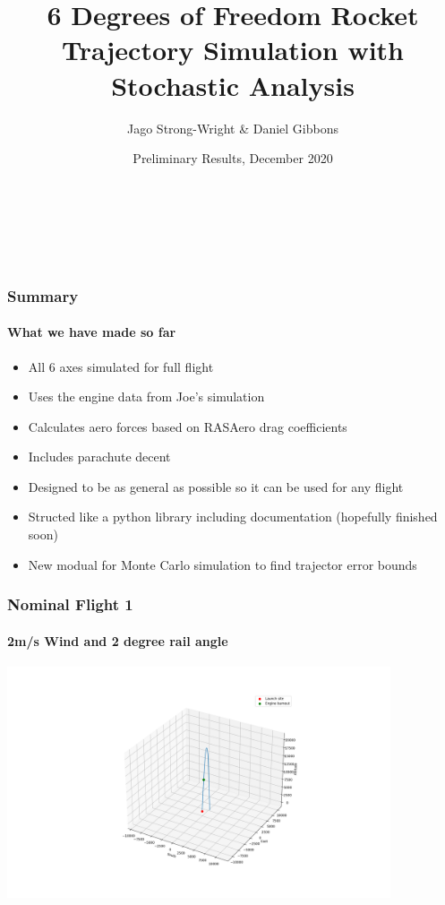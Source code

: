 \documentclass{beamer}
\title[6DOF Trajectory Simulation: Preliminary Results]{6 Degrees of Freedom Rocket Trajectory Simulation with Stochastic Analysis} %
\author%
{Jago Strong-Wright \& Daniel Gibbons
}
\institute%
{%
    \textit{}\\
    \textit{}
}
\date[Dec 2020]{Preliminary Results, December 2020} %
\begin{document}
    \begin{frame}
        \begin{titlepage}
                {\inserttitle\\[0.9cm]}
                {\insertauthor\par}
                {\insertinstitute\\[0.3cm]}
                {\insertdate}
        \end{titlepage}
    \end{frame}
    \begin{frame}
        \frametitle{Summary}
        \framesubtitle{What we have made so far}

        \begin{itemize}
            \item All 6 axes simulated for full flight
            \item Uses the engine data from Joe's simulation 
            \item Calculates aero forces based on RASAero drag coefficients
            \item Includes parachute decent
            \item Designed to be as general as possible so it can be used for any flight
            \item Structed like a python library including documentation (hopefully finished soon)
            \item New modual for Monte Carlo simulation to find trajector error bounds
        \end{itemize} 

    \end{frame}
    \begin{frame}
        \frametitle{Nominal Flight 1}
        \framesubtitle{2m/s Wind and 2 degree rail angle}
        \includegraphics[width=0.85\textwidth]{images/example1.png}
    \end{frame}
\end{document}
